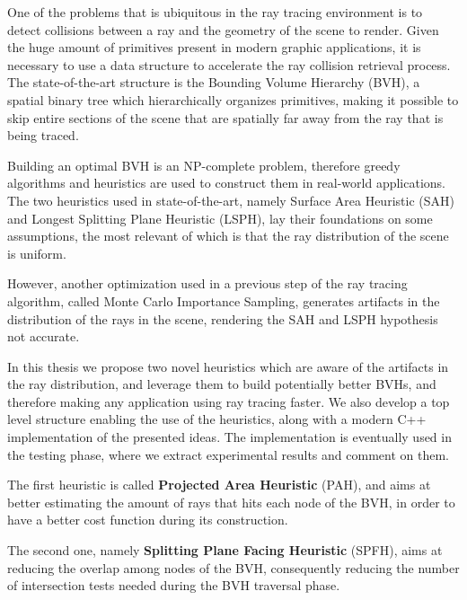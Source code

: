 \documentclass{PoliMi_MasterThesis}
\begin{document}
One of the problems that is ubiquitous in the ray tracing environment is to detect collisions between a ray and the geometry of the scene to render. Given the huge amount of primitives present in modern graphic applications, it is necessary to use a data structure to accelerate the ray collision retrieval process. The state-of-the-art structure is the Bounding Volume Hierarchy (BVH), a spatial binary tree which hierarchically organizes primitives, making it possible to skip entire sections of the scene that are spatially far away from the ray that is being traced. 

Building an optimal BVH is an NP-complete problem, therefore greedy algorithms and heuristics are used to construct them in real-world applications. The two heuristics used in state-of-the-art, namely Surface Area Heuristic (SAH) and Longest Splitting Plane Heuristic (LSPH), lay their foundations on some assumptions, the most relevant of which is that the ray distribution of the scene is uniform.

However, another optimization used in a previous step of the ray tracing algorithm, called Monte Carlo Importance Sampling, generates artifacts in the distribution of the rays in the scene, rendering the SAH and LSPH hypothesis not accurate.

In this thesis we propose two novel heuristics which are aware of the artifacts in the ray distribution, and leverage them to build potentially better BVHs, and therefore making any application using ray tracing faster. We also develop a top level structure enabling the use of the heuristics, along with a modern C++ implementation of the presented ideas. The implementation is eventually used in the testing phase, where we extract experimental results and comment on them.

The first heuristic is called \textbf{Projected Area Heuristic} (PAH), and aims at better estimating the amount of rays that hits each node of the BVH, in order to have a better cost function during its construction.

The second one, namely \textbf{Splitting Plane Facing Heuristic} (SPFH), aims at reducing the overlap among nodes of the BVH, consequently reducing the number of intersection tests needed during the BVH traversal phase.
\end{document}
